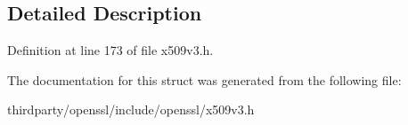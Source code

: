 \subsection{Detailed Description}


Definition at line 173 of file x509v3.\+h.



The documentation for this struct was generated from the following file\+:\begin{DoxyCompactItemize}
\item 
thirdparty/openssl/include/openssl/x509v3.\+h\end{DoxyCompactItemize}
